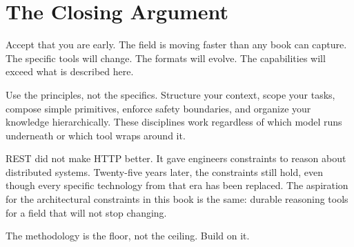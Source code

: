 \documentclass[
  a4paper,
  DIV=11,
  numbers=noendperiod]{scrreprt}
\begin{document}
\section{The Closing Argument}\label{the-closing-argument}

Accept that you are early. The field is moving faster than any book can
capture. The specific tools will change. The formats will evolve. The
capabilities will exceed what is described here.

Use the principles, not the specifics. Structure your context, scope
your tasks, compose simple primitives, enforce safety boundaries, and
organize your knowledge hierarchically. These disciplines work
regardless of which model runs underneath or which tool wraps around it.

REST did not make HTTP better. It gave engineers constraints to reason
about distributed systems. Twenty-five years later, the constraints
still hold, even though every specific technology from that era has been
replaced. The aspiration for the architectural constraints in this book
is the same: durable reasoning tools for a field that will not stop
changing.

The methodology is the floor, not the ceiling. Build on it.
\end{document}
